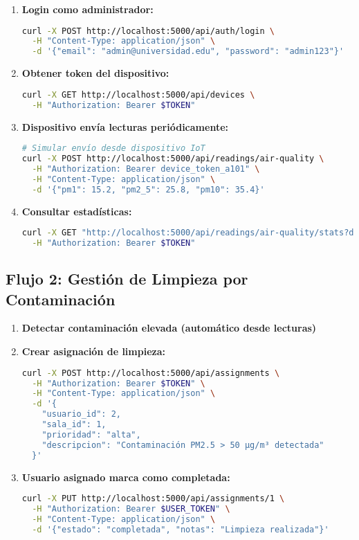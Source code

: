 \documentclass[12pt,a4paper]{article}
\begin{document}
\begin{enumerate}
\item \textbf{Login como administrador:}
\begin{lstlisting}[language=bash]
curl -X POST http://localhost:5000/api/auth/login \
  -H "Content-Type: application/json" \
  -d '{"email": "admin@universidad.edu", "password": "admin123"}'
\end{lstlisting}

\item \textbf{Obtener token del dispositivo:}
\begin{lstlisting}[language=bash]
curl -X GET http://localhost:5000/api/devices \
  -H "Authorization: Bearer $TOKEN"
\end{lstlisting}

\item \textbf{Dispositivo envía lecturas periódicamente:}
\begin{lstlisting}[language=bash]
# Simular envío desde dispositivo IoT
curl -X POST http://localhost:5000/api/readings/air-quality \
  -H "Authorization: Bearer device_token_a101" \
  -H "Content-Type: application/json" \
  -d '{"pm1": 15.2, "pm2_5": 25.8, "pm10": 35.4}'
\end{lstlisting}

\item \textbf{Consultar estadísticas:}
\begin{lstlisting}[language=bash]
curl -X GET "http://localhost:5000/api/readings/air-quality/stats?device_id=1" \
  -H "Authorization: Bearer $TOKEN"
\end{lstlisting}
\end{enumerate}

\subsection{Flujo 2: Gestión de Limpieza por Contaminación}

\begin{enumerate}
\item \textbf{Detectar contaminación elevada (automático desde lecturas)}

\item \textbf{Crear asignación de limpieza:}
\begin{lstlisting}[language=bash]
curl -X POST http://localhost:5000/api/assignments \
  -H "Authorization: Bearer $TOKEN" \
  -H "Content-Type: application/json" \
  -d '{
    "usuario_id": 2,
    "sala_id": 1,
    "prioridad": "alta",
    "descripcion": "Contaminación PM2.5 > 50 µg/m³ detectada"
  }'
\end{lstlisting}

\item \textbf{Usuario asignado marca como completada:}
\begin{lstlisting}[language=bash]
curl -X PUT http://localhost:5000/api/assignments/1 \
  -H "Authorization: Bearer $USER_TOKEN" \
  -H "Content-Type: application/json" \
  -d '{"estado": "completada", "notas": "Limpieza realizada"}'
\end{lstlisting}
\end{enumerate}
\end{document}
